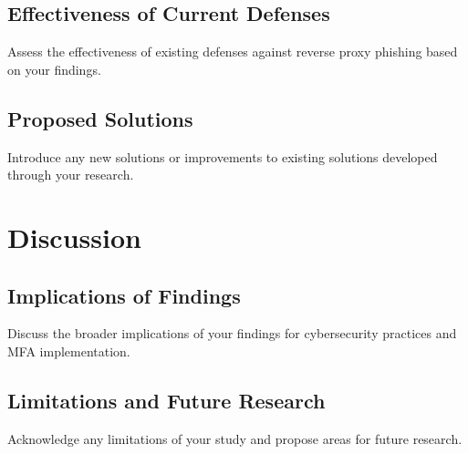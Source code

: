 \documentclass[12pt]{report}
\begin{document}
\section{Effectiveness of Current Defenses}
Assess the effectiveness of existing defenses against reverse proxy phishing based
on your findings.

\section{Proposed Solutions}
Introduce any new solutions or improvements to existing solutions developed through
your research.

\chapter{Discussion}
\section{Implications of Findings}
Discuss the broader implications of your findings for cybersecurity practices and
MFA implementation.

\section{Limitations and Future Research}
Acknowledge any limitations of your study and propose areas for future research.

\newpage


\end{document}
